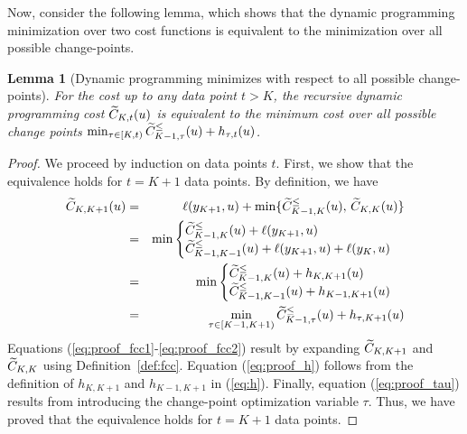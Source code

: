 \documentclass{article}
\newtheorem{lemma}{Lemma}
\begin{document}
Now, consider the following lemma, which shows that the dynamic
programming minimization over two cost functions is equivalent to the
minimization over all possible change-points.
\begin{lemma}[Dynamic programming minimizes with respect to all possible change-points]
\label{lemma:t_change_points}
  For the cost up to any data point $t> K$, the recursive dynamic
  programming cost $\widetilde{C}_{K,t}(u)$ is equivalent to the minimum cost
  over all possible change points
  $\min_{\tau\in[K,t)}\widetilde{C}_{K-1,\tau}^\leq(u)+h_{\tau,t}(u)$.
\end{lemma}

\begin{proof}
  We proceed by induction on data points $t$. First, we show that the
  equivalence holds for $t=K+1$ data points. By definition, we have
  \begin{eqnarray}
    \widetilde{C}_{K,K+1}(u)
    &=&\label{eq:proof_fcc1}\ell(y_{K+1},u)+\min\{\widetilde{C}_{K-1,K}^\leq(u),\,\widetilde{C}_{K,K}(u)\}\\
    &=&\min\label{eq:proof_fcc2}
        \begin{cases}
          \widetilde{C}_{K-1,K}^\leq(u)+\ell(y_{K+1},u)\\
          \widetilde{C}_{K-1,K-1}^\leq(u)+\ell(y_{K+1},u)+\ell(y_K,u)
        \end{cases}\\
    &=&\min\label{eq:proof_h}
        \begin{cases}
          \widetilde{C}_{K-1,K}^\leq(u)+h_{K,K+1}(u)\\
          \widetilde{C}_{K-1,K-1}^\leq(u)+h_{K-1,K+1}(u)
        \end{cases}\\
    \label{eq:proof_tau}
    &=&\min_{\tau\in[K-1,K+1)} \widetilde{C}_{K-1,\tau}^\leq(u)+h_{\tau,K+1}(u)
  \end{eqnarray}
  Equations (\ref{eq:proof_fcc1}-\ref{eq:proof_fcc2}) result by
  expanding $\widetilde{C}_{K,K+1}$ and $\widetilde{C}_{K,K}$ using
  Definition~\ref{def:fcc}. Equation (\ref{eq:proof_h}) follows from
  the definition of $h_{K,K+1}$ and $h_{K-1,K+1}$ in
  (\ref{eq:h}). Finally, equation (\ref{eq:proof_tau}) results from
  introducing the change-point optimization variable $\tau$. Thus, we
  have proved that the equivalence holds for $t=K+1$ data points.


\end{proof}
\end{document}
